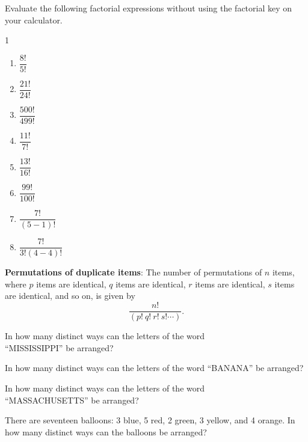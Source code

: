\begin{exe}
Evaluate the following factorial expressions without using the factorial key on your calculator.
\begin{multicols}{1}
\begin{enumerate}
	\item $\dfrac{8!}{5!}$\vfill
	\item $\dfrac{21!}{24!}$\vfill
	\item $\dfrac{500!}{499!}$\vfill
	\item $\dfrac{11!}{7!}$\vfill
	\item $\dfrac{13!}{16!}$\vfill
	\item $\dfrac{99!}{100!}$\vfill
	\item $\dfrac{7!}{(5-1)!}$\vfill
	\item $\dfrac{7!}{3!(4-4)!}$\vfill
\end{enumerate}
\end{multicols}
\end{exe}\vfill
\pagebreak

\begin{tcolorbox}[enhanced,width=6.5in,center upper,size=fbox,drop shadow southwest,sharp corners]

{\bf Permutations of duplicate items}: 
The number of permutations of $n$ items, where $p$ items are identical, $q$ items are identical, $r$ items are identical, $s$ items are identical, and so on, is given by
$$\displaystyle\frac{n!}{(p!\ q!\ r!\ s! \cdots)}.$$  
\end{tcolorbox}

\begin{exe}
In how many distinct ways can the letters of the word\\ ``MISSISSIPPI'' be arranged?
\end{exe}\vfill

\begin{ex}
In how many distinct ways can the letters of the word ``BANANA'' be arranged?
\end{ex}
\vfill
\begin{ex}
In how many distinct ways can the letters of the word\\ ``MASSACHUSETTS'' be arranged?
\end{ex}
\vfill
\begin{ex}
There are seventeen balloons: 3 blue, 5 red, 2 green, 3 yellow, and 4 orange. In how many distinct ways can the balloons be arranged?
\end{ex}
\vfill
\pagebreak

